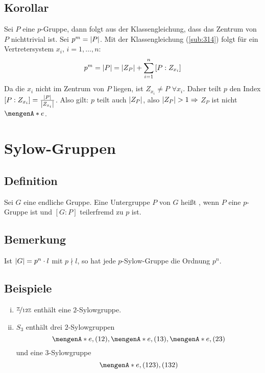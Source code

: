 \subsection[Korollar: $p$-Gruppen haben ein nichttriviales Zentrum]{Korollar} %
\label{sub:317}
Sei $P$ eine $p$-Gruppe, dann folgt aus der Klassengleichung, dass das Zentrum von $P$ nichttrivial ist.
Sei $p^m = \abs*{P} $. Mit der Klassengleichung (\ref{sub:314}) folgt für ein Vertretersystem $x_i$, $i=1,\ldots ,n$:
\[
	p^m = \abs*{P} = \abs*{Z_P} + \sum_{i=1}^{n} \left[P : Z_{x_i}\right]  
\]
Da die $x_i$ nicht im Zentrum von $P$ liegen, ist $Z_{x_i} \not= P$ $\forall x_i$. Daher teilt $p$ den Index $[P:Z_{x_i}] = \frac{\abs*{P} }{\abs*{Z_{x_i}}}$. Also gilt: $p$ teilt
auch $\abs*{Z_P} $, also $\abs*{Z_P} >1 \Rightarrow $ $Z_P$ ist nicht $\set{e} $. \bewende
\newpage

\section{Sylow-Gruppen} %
\label{sec:4}

\subsection[Definition: $p$-Sylow-Gruppe]{Definition} %
\label{sub:41}
Sei $G$ eine endliche Gruppe. Eine Untergruppe $P$ von $G$ heißt , wenn $P$ eine $p$-Gruppe ist und $[G:P]$ teilerfremd zu $p$ ist. 

\subsection[Bemerkung über die Ordnung von $p$-Sylowgruppen]{Bemerkung} %
\label{sub:42}
Ist $\abs*{G}= p^n \cdot l $ mit $p \nmid l$, so hat jede $p$-Sylow-Gruppe die Ordnung $p^n$.

\subsection[Beispiele für $p$-Sylowgruppen]{Beispiele} %
\label{sub:43}
\begin{enumerate}[(i)]
	\item $\nicefrac{\mathds{Z}}{12 \mathds{Z}}$ enthält eine $2$-Sylowgruppe.
	\item $S_3$ enthält drei $2$-Sylowgruppen
	\[
		\set{e, (1 2)}, \set{e,(1 3)}, \set{e, (2 3)}   
	\]
	und eine $3$-Sylowgruppe
	\[
		\set{e, (1 2 3), (1 3 2)} 
	\]
\end{enumerate}

